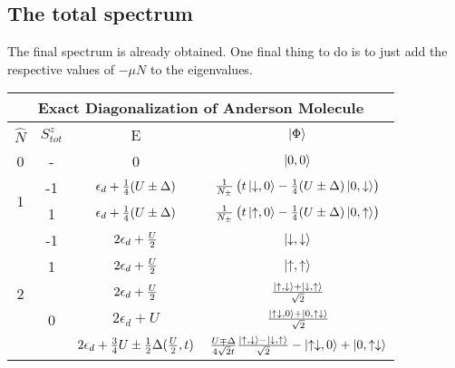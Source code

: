 \documentclass[12pt]{article}
\begin{document}
\subsection{The total spectrum}
The final spectrum is already obtained. One final thing to do is to just add the respective values of \(-\mu N\) to the eigenvalues.
\begin{center}
\begin{tabular}{@{}cccc@{}}
\toprule
\multicolumn{4}{c}{\bf{Exact Diagonalization of Anderson Molecule}} \\
\toprule
\(\hat{N}\) & \(S_{tot}^z\) & E & \(\ket{\Phi}\)\\
\toprule
0 & - & 0 & \(\ket{0,0}\) \\ \toprule
\multirow{2}{*}{1} & -1 & \(\epsilon_d + \frac{1}{4}(U\pm\Delta)\)  & \(\frac{1}{N_\pm}\left({t\ket{\downarrow,0}-\frac{1}{4}(U\pm\Delta)\ket{0,\downarrow}}\right)\) \\

 \cmidrule(l){2-4}

& 1 & \(\epsilon_d + \frac{1}{4}(U\pm\Delta)\)  & \(\frac{1}{N_\pm}\left({t\ket{\uparrow,0}-\frac{1}{4}(U\pm\Delta)\ket{0,\uparrow}}\right)\) \\
 \toprule

\multirow{6}{*}{2}                     & -1                  & \(2\epsilon_d+\frac{U}{2}\)   & \(\ket{\downarrow,\downarrow}\)  \\
 \cmidrule(l){2-4} 
                                       & 1                   & \(2\epsilon_d+\frac{U}{2}\)   & \(\ket{\uparrow,\uparrow}\) \\
                                       \cmidrule(l){2-4} 
                                       & \multirow{3}{*}{0}  & \(2\epsilon_d+\frac{U}{2}\)   & \(\frac{\ket{\uparrow,\downarrow}+\ket{\downarrow,\uparrow}}{\sqrt{2}}\)  \\
                                        \cmidrule(l){3-4} 

                                       &                     & \(2\epsilon_d+U\)  & \(\frac{\ket{\uparrow\downarrow,0}+\ket{0,\uparrow\downarrow}}{\sqrt{2}}\)  \\
                                        \cmidrule(l){3-4} 

                                       &                     & \(2\epsilon_d+\frac{3}{4}U\pm\frac{1}{2}\Delta(\frac{U}{2},t)\)    & \(\frac{U\mp\Delta}{4\sqrt{2}t}\frac{\ket{\uparrow,\downarrow} - \ket{\downarrow,\uparrow}}{\sqrt 2}-\ket{\uparrow\downarrow,0} + \ket{0,\uparrow\downarrow}\)  \\
                                     

\end{tabular}
\end{center}
\end{document}
